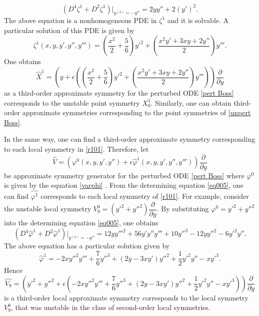 \documentclass[11pt,letter,subeqn]{article}
\begin{document}
   \[
     \left(D^4 \zeta^{1}+D^{2}\zeta^{1}\right)\bigg|_{y^{(4)}=-y''}=2yy''+2(y')^2.
   \]
   The above equation is a nonhomogeneous PDE in $\zeta^{1}$ and it is solvable. A particular solution of this PDE is given by
   \[
     \zeta^{1}(x,y,y',y'',y''')=\left(\dfrac{x^2}{2}+\dfrac{5}{6}\right){y'}^2+\left(\dfrac{x^2y'+3xy+2y''}{2}\right)y'''.
   \]
   One obtains
    \[
      \hat{X}^1 =\left(y+\epsilon \left(\left(\dfrac{x^2}{2}+\dfrac{5}{6}\right){y'}^2+\left(\dfrac{x^2y'+3xy+2y''}{2}\right)y'''\right)\right)\dfrac{\partial}{\partial y}
    \]
    as a third-order approximate symmetry for the perturbed ODE \eqref{pert Boss} corresponds to the {\textrm{unstable}} point symmetry $X_0^1$. Similarly, one can obtain third-order approximate symmetries corresponding to the point symmetries of \eqref{unpert Boss}.

    In the same way, one can find a third-order approximate symmetry corresponding to each local symmetry in \eqref{r101}. Therefore, let
    \begin{equation}\label{}
     \hat{V} =\left(\varphi^0(x,y,y',y'')+\epsilon \hat{\varphi}^1(x,y,y',y'',y''')\right)\dfrac{\partial}{\partial y}
   \end{equation}
    be approximate symmetry generator for the perturbed ODE \eqref{pert Boss} where $\varphi^0$ is given by the equation \eqref{varphi} . From the determining equation \eqref{eq005}, one can find $\hat{\varphi^1}$ corresponds to each local symmetry of \eqref{r101}. For example, consider the unstable local symmetry $V_9^0= \left(y'^2+{y''}^2\right) \dfrac{\partial}{\partial y}$. By substituting  $\varphi^0=y'^2+{y''}^2$ into the determining equation \eqref{eq005}, one obtains
    \begin{equation}\label{}
    \left(D^4 \hat{\varphi}^1+D^{2}\hat{\varphi}^1\right)\bigg|_{y^{(4)}=-y''}=12y{y'''}^2+56y'y''y'''+10{y''}^3-12y{y''}^2-6{y'}^2y''.
   \end{equation}
   The above equation has a particular solution given by
   \begin{equation}\label{}
     \hat{\varphi}^1=-2x{y''}^2y'''+\dfrac{7}{6}{y''}^3+\left(2y-3xy'\right){y''}^2+\dfrac{1}{2}{y'}^2y''-x{y'}^3.
   \end{equation}
   Hence
   \[
      \hat{V_9} =\left(y'^2+{y''}^2+\epsilon \left(-2x{y''}^2y'''+\dfrac{7}{6}{y''}^3+\left(2y-3xy'\right){y''}^2+\dfrac{1}{2}{y'}^2y''-x{y'}^3\right)\right)\dfrac{\partial}{\partial y}
    \]
    is a third-order local approximate symmetry corresponds to the local symmetry $V_9^0$, that was unstable in the class of second-order local symmetries.
\end{document}
